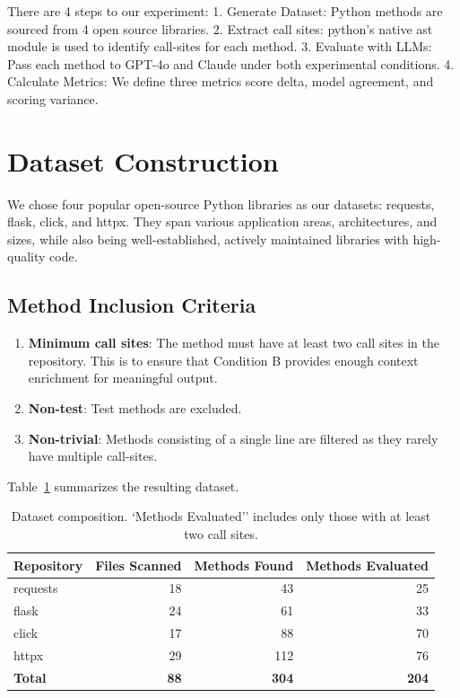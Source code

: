\documentclass[12pt]{report}
\begin{document}
There are 4 steps to our experiment: 
1. Generate Dataset: Python methods are sourced from 4 open source libraries.
2. Extract call sites: python's native ast module is used to identify call-sites for each method.
3. Evaluate with LLMs: Pass each method to GPT-4o and Claude under both experimental conditions.
4. Calculate Metrics: We define three metrics score delta, model agreement, and scoring variance.

\section{Dataset Construction}

We chose four popular open-source Python libraries as our datasets: requests, flask, click, and httpx. They span various application areas, architectures, and sizes, while also being well-established, actively maintained libraries with high-quality code.

\subsection{Method Inclusion Criteria}

\begin{enumerate}
    \item \textbf{Minimum call sites}: The method must have at least two call sites in the repository. This is to ensure that Condition B provides enough context enrichment for meaningful output.
    \item \textbf{Non-test}: Test methods are excluded.
    \item \textbf{Non-trivial}: Methods consisting of a single line are filtered as they rarely have multiple call-sites.
\end{enumerate}

Table~\ref{tab:dataset} summarizes the resulting dataset.

\begin{table}[htbp]
\centering
\begin{tabular}{lrrr}
\toprule
\textbf{Repository} & \textbf{Files Scanned} & \textbf{Methods Found} & \textbf{Methods Evaluated} \\
\midrule
requests & 18 & 43  & 25 \\
flask    & 24 & 61  & 33 \\
click    & 17 & 88  & 70 \\
httpx    & 29 & 112 & 76 \\
\midrule
\textbf{Total} & \textbf{88} & \textbf{304} & \textbf{204} \\
\bottomrule
\end{tabular}
\caption{Dataset composition. `Methods Evaluated'' includes only those with at least two call sites.}
\label{tab:dataset}
\end{table}
\end{document}
